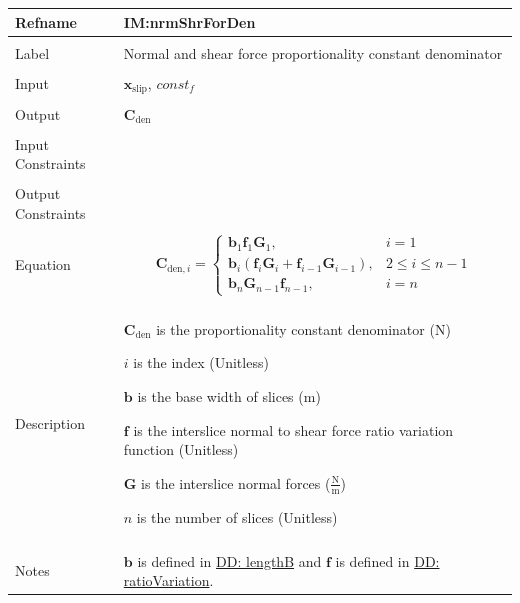\documentclass[12pt]{article}
\begin{document}
\vspace{\baselineskip}
\noindent
\begin{minipage}{\textwidth}
\begin{tabular}{>{\raggedright}p{}>{\raggedright\arraybackslash}p{}}
\toprule \textbf{Refname} & \textbf{IM:nrmShrForDen}
\label{IM:nrmShrForDen}
\\ \midrule \\
Label & Normal and shear force proportionality constant denominator
        
\\ \midrule \\
Input & ${\mathbf{x}_{\text{slip}}}$, $const_f$
        
\\ \midrule \\
Output & ${\mathbf{C}_{\text{den}}}$
         
\\ \midrule \\
Input Constraints & 
\\ \midrule \\
Output Constraints & 
\\ \midrule \\
Equation & \begin{displaymath}
           {\mathbf{C}_{\text{den},i}}=\begin{cases}
                                       {\mathbf{b}}_{1} {\mathbf{f}}_{1} {\mathbf{G}}_{1}, & i=1\\
                                       {\mathbf{b}}_{i} \left({\mathbf{f}}_{i} {\mathbf{G}}_{i}+{\mathbf{f}}_{i-1} {\mathbf{G}}_{i-1}\right), & 2\leq{}i\leq{}n-1\\
                                       {\mathbf{b}}_{n} {\mathbf{G}}_{n-1} {\mathbf{f}}_{n-1}, & i=n
                                       \end{cases}
           \end{displaymath}
\\ \midrule \\
Description & \begin{symbDescription}
              \item{${\mathbf{C}_{\text{den}}}$ is the proportionality constant denominator (N)}
              \item{$i$ is the index (Unitless)}
              \item{$\mathbf{b}$ is the base width of slices (m)}
              \item{$\mathbf{f}$ is the interslice normal to shear force ratio variation function (Unitless)}
              \item{$\mathbf{G}$ is the interslice normal forces ($\frac{\text{N}}{\text{m}}$)}
              \item{$n$ is the number of slices (Unitless)}
              \end{symbDescription}
\\ \midrule \\
Notes & $\mathbf{b}$ is defined in \hyperref[DD:lengthB]{DD: lengthB} and $\mathbf{f}$ is defined in \hyperref[DD:ratioVariation]{DD: ratioVariation}.
        

\end{tabular}
\end{minipage}
\end{document}
